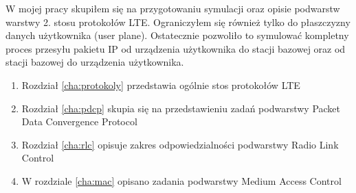 W mojej pracy skupiłem się na przygotowaniu symulacji oraz opisie podwarstw warstwy 2. stosu protokołów LTE. Ograniczyłem się również tylko do płaszczyzny danych użytkownika (user plane). Ostatecznie pozwoliło to symulować kompletny proces przesyłu pakietu IP od urządzenia użytkownika do stacji bazowej oraz od stacji bazowej do urządzenia użytkownika.

\begin{enumerate}%

\item Rozdział \ref{cha:protokoly} przedstawia ogólnie stos protokołów LTE
\item Rozdział \ref{cha:pdcp} skupia się na przedstawieniu zadań podwarstwy Packet Data Convergence Protocol
\item Rozdział \ref{cha:rlc} opisuje zakres odpowiedzialności podwarstwy Radio Link Control
\item W rozdziale \ref{cha:mac} opisano zadania podwarstwy Medium Access Control

\end{enumerate}
